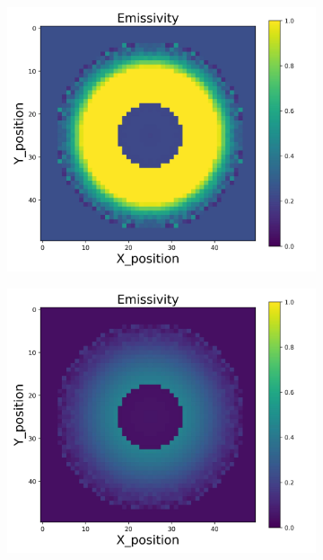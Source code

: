 {\begin{figure}[p]
\begin{minipage}{\textwidth}
\begin{subfigure}{0.325\textwidth}
        \end{subfigure}
    \end{minipage}\\
    \begin{minipage}{\textwidth}
        \centering
        \begin{subfigure}{0.325\textwidth}
            \centering
            \includegraphics[width=\textwidth]{figures/raw_data/25/mix/emi_cal.jpg}
        \end{subfigure}
        \begin{subfigure}{0.325\textwidth}
            \centering
            \includegraphics[width=\textwidth]{figures/raw_data/26/mix/emi_cal.jpg}

\end{subfigure}
\end{minipage}
\end{figure}}
